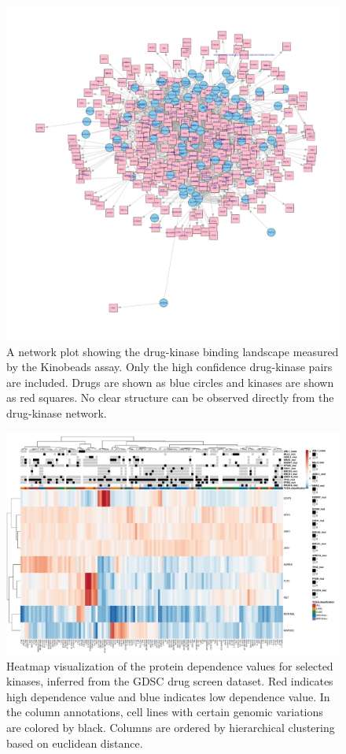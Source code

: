 \documentclass{scrartcl}
\begin{document}
\begin{figure}[h]
    \centering
    \includegraphics[width=16cm]{drugTargetNet_EMBL-1}
    \caption{A network plot showing the drug-kinase binding landscape measured by the Kinobeads assay. Only the high confidence drug-kinase pairs are included. Drugs are shown as blue circles and kinases are shown as red squares. No clear structure can be observed directly from the drug-kinase network.}
\end{figure}


\begin{figure}[h]
    \centering
    \includegraphics[width=15cm]{GDSC_coefHeatmap-1}
    \caption{Heatmap visualization of the protein dependence values for selected kinases, inferred from the GDSC drug screen dataset. Red indicates high dependence value and blue indicates low dependence value. In the column annotations, cell lines with certain genomic variations are colored by black. Columns are ordered by hierarchical clustering based on euclidean distance.} 
    
\end{figure}
\end{document}
